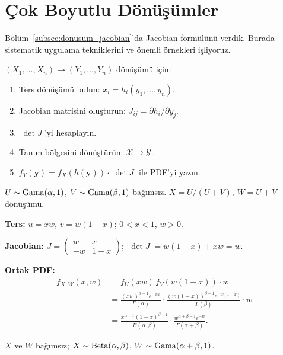 \section{Çok Boyutlu Dönüşümler}
\label{sec:cok_boyut_donusum}

Bölüm~\ref{subsec:donusum_jacobian}'da Jacobian formülünü verdik.
Burada sistematik uygulama tekniklerini ve önemli örnekleri işliyoruz.

\begin{onerme}
\label{prop:jacobian_adim}
$(X_1, \ldots, X_n) \to (Y_1, \ldots, Y_n)$ dönüşümü için:
\begin{enumerate}[(1)]
  \item Ters dönüşümü bulun: $x_i = h_i(y_1,\ldots,y_n)$.
  \item Jacobian matrisini oluşturun: $J_{ij} = \partial h_i/\partial y_j$.
  \item $|\det J|$'yi hesaplayın.
  \item Tanım bölgesini dönüştürün: $\mathcal{X} \to \mathcal{Y}$.
  \item $f_Y(\mathbf{y}) = f_X(h(\mathbf{y})) \cdot |\det J|$ ile PDF'yi yazın.
\end{enumerate}
\end{onerme}

\begin{ornek}
\label{ex:beta_gama_turetme}
$U \sim \operatorname{Gama}(\alpha, 1)$, $V \sim \operatorname{Gama}(\beta, 1)$ bağımsız.
$X = U/(U+V)$, $W = U+V$ dönüşümü.

\textbf{Ters:} $u = xw$, $v = w(1-x)$; $0 < x < 1$, $w > 0$.

\textbf{Jacobian:}
$J = \begin{pmatrix} w & x \\ -w & 1-x \end{pmatrix}$; $|\det J| = w(1-x) + xw = w$.

\textbf{Ortak PDF:}
\begin{align*}
  f_{X,W}(x,w) &= f_U(xw)\,f_V(w(1-x))\cdot w \\
  &= \frac{(xw)^{\alpha-1}e^{-xw}}{\Gamma(\alpha)} \cdot \frac{(w(1-x))^{\beta-1}e^{-w(1-x)}}{\Gamma(\beta)} \cdot w \\
  &= \frac{x^{\alpha-1}(1-x)^{\beta-1}}{B(\alpha,\beta)} \cdot \frac{w^{\alpha+\beta-1}e^{-w}}{\Gamma(\alpha+\beta)}.
\end{align*}

$X$ ve $W$ bağımsız; $X \sim \operatorname{Beta}(\alpha,\beta)$, $W \sim \operatorname{Gama}(\alpha+\beta, 1)$.
\end{ornek}

